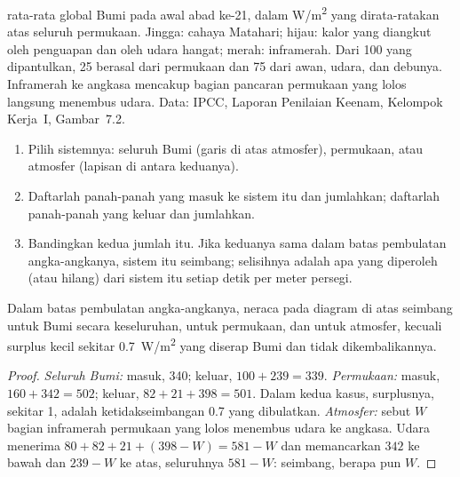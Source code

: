 \begin{omfigure}
{\small {} rata-rata global Bumi pada awal abad ke-21, dalam
\unit{W/m^2} yang dirata-ratakan atas seluruh permukaan. Jingga: cahaya
Matahari; hijau: kalor yang diangkut oleh penguapan dan oleh udara hangat;
merah: inframerah. Dari 100 yang dipantulkan, 25 berasal dari permukaan dan 75
dari awan, udara, dan debunya. Inframerah ke angkasa mencakup bagian pancaran
permukaan yang lolos langsung menembus udara. Data: IPCC, Laporan Penilaian
Keenam, Kelompok Kerja~I, Gambar~7.2.}
\end{omfigure}

\begin{method}\label{met:g10:earth-energy-budget:reading}
\begin{enumerate}
  \item Pilih sistemnya: seluruh Bumi (garis di atas atmosfer), permukaan,
        atau atmosfer (lapisan di antara keduanya).
  \item Daftarlah panah-panah yang masuk ke sistem itu dan jumlahkan; daftarlah
        panah-panah yang keluar dan jumlahkan.
  \item Bandingkan kedua jumlah itu. Jika keduanya sama dalam batas pembulatan
        angka-angkanya, sistem itu seimbang; selisihnya adalah apa yang
        diperoleh (atau hilang) dari sistem itu setiap detik per meter
        persegi.
\end{enumerate}
\end{method}

\begin{proposition}\label{prop:g10:earth-energy-budget:balance}
Dalam batas pembulatan angka-angkanya, neraca pada diagram di atas seimbang
untuk Bumi secara keseluruhan, untuk permukaan, dan untuk atmosfer, kecuali
surplus kecil sekitar \qty{0.7}{W/m^2} yang diserap Bumi dan tidak
dikembalikannya.
\end{proposition}

\begin{proof}
\emph{Seluruh Bumi:} masuk, 340; keluar, $100 + 239 = 339$.
\emph{Permukaan:} masuk, $160 + 342 = 502$; keluar, $82 + 21 + 398 = 501$.
Dalam kedua kasus, surplusnya, sekitar 1, adalah ketidakseimbangan 0.7 yang
dibulatkan. \emph{Atmosfer:} sebut $W$ bagian inframerah permukaan yang lolos
menembus udara ke angkasa. Udara menerima $80 + 82 + 21 + (398 - W) = 581 - W$
dan memancarkan $342$ ke bawah dan $239 - W$ ke atas, seluruhnya $581 - W$:
seimbang, berapa pun $W$.
\end{proof}

